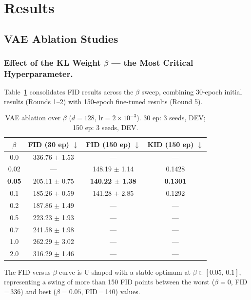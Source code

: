 \documentclass[runningheads]{llncs}
\begin{document}
\section{Results}\label{sec:results}

\subsection{VAE Ablation Studies}\label{sec:ablation_vae}

\subsubsection{Effect of the KL Weight $\beta$ — the Most Critical Hyperparameter.}

Table~\ref{tab:vae_beta} consolidates FID results across the $\beta$ sweep, combining 30-epoch initial results (Rounds 1--2) with 150-epoch fine-tuned results (Round 5).

\begin{table}[htbp]
\caption{VAE ablation over $\beta$ ($d=128$, lr$=2{\times}10^{-3}$). 30 ep: 3 seeds, DEV; 150 ep: 3 seeds, DEV.}\label{tab:vae_beta}
\centering
\begin{tabular}{cccc}
\toprule
$\beta$ & FID (30 ep) $\downarrow$ & FID (150 ep) $\downarrow$ & KID (150 ep) $\downarrow$ \\
\midrule
0.0  & 336.76 $\pm$ 1.53 & — & — \\
0.02 & — & 148.19 $\pm$ 1.14 & 0.1428 \\
\textbf{0.05} & 205.11 $\pm$ 0.75 & \textbf{140.22 $\pm$ 1.38} & \textbf{0.1301} \\
0.1  & 185.26 $\pm$ 0.59 & 141.28 $\pm$ 2.85 & 0.1292 \\
0.2  & 187.86 $\pm$ 1.49 & — & — \\
0.5  & 223.23 $\pm$ 1.93 & — & — \\
0.7  & 241.58 $\pm$ 1.98 & — & — \\
1.0  & 262.29 $\pm$ 3.02 & — & — \\
2.0  & 316.29 $\pm$ 1.46 & — & — \\
\bottomrule
\end{tabular}
\end{table}

The FID-versus-$\beta$ curve is U-shaped with a stable optimum at $\beta \in [0.05,\,0.1]$, representing a swing of more than 150 FID points between the worst ($\beta=0$, FID\,=\,336) and best ($\beta=0.05$, FID\,=\,140) values.
\end{document}
